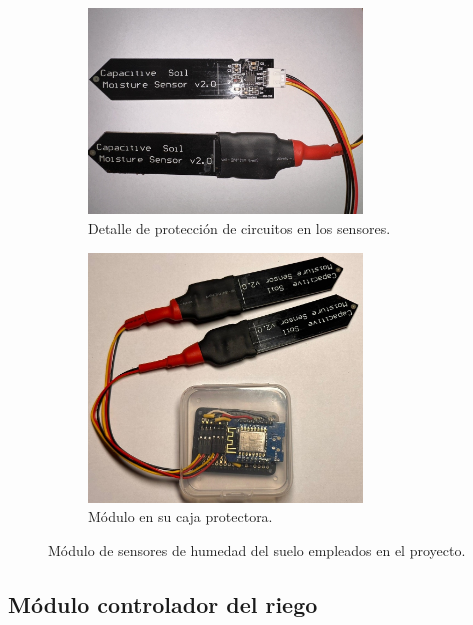 \begin{figure}[!h]
\begin{subfigure}[b]{0.45\textwidth}
	\centering
		\includegraphics[width=0.80\textwidth]{./Figures/soil_compare.jpg}
		\caption[Detalle de protección de circuitos en los sensores]{Detalle de protección de circuitos en los sensores.}
		\label{fig:soil3}
     \end{subfigure}	
			\begin{subfigure}[b]{0.45\textwidth}
	\centering
		\includegraphics[width=0.80\textwidth]{./Figures/soil3.jpg}
		\caption[Módulo en su caja protectora]{Módulo en su caja protectora.}
		\label{fig:soil4}
     \end{subfigure}
     \hfill
        \caption[Módulos de sensores de humedad del suelo  empleados en el proyecto]{Módulo de sensores de humedad del suelo  empleados en el proyecto.}
        \label{fig:soilsenors}
\end{figure}


\pagebreak

\subsection{Módulo controlador del riego}
\label{Módulo controlador del riego}

